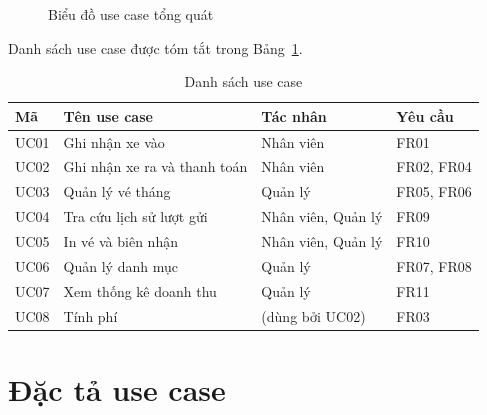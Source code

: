 \begin{figure}[htbp]
  \caption{Biểu đồ use case tổng quát}
  \label{fig:usecase}
\end{figure}

Danh sách use case được tóm tắt trong Bảng~\ref{tab:dsuc}.

\begin{table}[h]
  \centering
  \begin{tabular}{@{}lp{5.2cm}p{3.4cm}l@{}}
    \toprule
    \textbf{Mã} & \textbf{Tên use case} & \textbf{Tác nhân} & \textbf{Yêu cầu} \\
    \midrule
    UC01 & Ghi nhận xe vào & Nhân viên & FR01 \\
    UC02 & Ghi nhận xe ra và thanh toán & Nhân viên & FR02, FR04 \\
    UC03 & Quản lý vé tháng & Quản lý & FR05, FR06 \\
    UC04 & Tra cứu lịch sử lượt gửi & Nhân viên, Quản lý & FR09 \\
    UC05 & In vé và biên nhận & Nhân viên, Quản lý & FR10 \\
    UC06 & Quản lý danh mục & Quản lý & FR07, FR08 \\
    UC07 & Xem thống kê doanh thu & Quản lý & FR11 \\
    UC08 & Tính phí & (dùng bởi UC02) & FR03 \\
    \bottomrule
  \end{tabular}
    \caption{Danh sách use case}
  \label{tab:dsuc}
\end{table}

\section{Đặc tả use case}

\newcommand{\specrow}[2]{\textbf{#1} & #2 \\ \hline}

